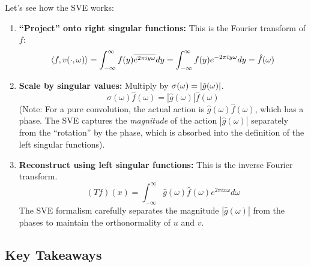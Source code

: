 \documentclass[aps,prl,reprint]{revtex4-2}
\begin{document}
Let's see how the SVE works:

\begin{enumerate}
\item \textbf{``Project'' onto right singular functions:} This is the
Fourier transform of $f$:  
\begin{equation*}
\langle f, v(\cdot, \omega) \rangle = \int_{-\infty}^{\infty} f(y) \overline{%
e^{2\pi i y \omega}} dy = \int_{-\infty}^{\infty} f(y) e^{-2\pi i y \omega}
dy = \hat{f}(\omega)  
\end{equation*}

\item \textbf{Scale by singular values:} Multiply by $\sigma(\omega) = |\hat{%
g}(\omega)|$.  
\begin{equation*}
\sigma(\omega) \hat{f}(\omega) = |\hat{g}(\omega)| \hat{f}(\omega)  
\end{equation*}
(Note: For a pure convolution, the actual action is $\hat{g}(\omega)\hat{f}%
(\omega)$, which has a phase. The SVE captures the \textit{magnitude} of the
action $|\hat{g}(\omega)|$ separately from the ``rotation'' by the phase,
which is absorbed into the definition of the left singular functions).

\item \textbf{Reconstruct using left singular functions:} This is the
inverse Fourier transform.  
\begin{equation*}
(Tf)(x) = \int_{-\infty}^{\infty} \hat{g}(\omega)\hat{f}(\omega) e^{2\pi i x
\omega} d\omega  
\end{equation*}
The SVE formalism carefully separates the magnitude $|\hat{g}(\omega)|$ from
the phases to maintain the orthonormality of $u$ and $v$.
\end{enumerate}

\subsection*{Key Takeaways}
\end{document}
